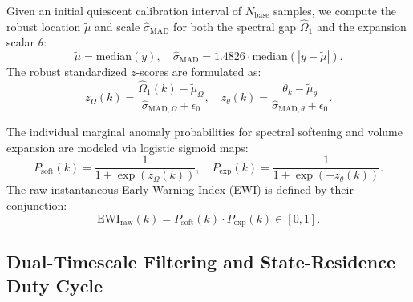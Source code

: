 \documentclass[11pt,a4paper]{article}
\begin{document}
Given an initial quiescent calibration interval of $N_{\mathrm{base}}$ samples, we compute the robust location $\tilde{\mu}$ and scale $\hat{\sigma}_{\mathrm{MAD}}$ for both the spectral gap $\hat{\Omega}_1$ and the expansion scalar $\theta$:
\begin{equation}
\tilde{\mu} = \mathrm{median}(y), \quad \hat{\sigma}_{\mathrm{MAD}} = 1.4826 \cdot \mathrm{median}\left( |y - \tilde{\mu}| \right).
\end{equation}
The robust standardized $z$-scores are formulated as:
\begin{equation}
z_{\Omega}(k) = \frac{\hat{\Omega}_1(k) - \tilde{\mu}_{\Omega}}{\hat{\sigma}_{\mathrm{MAD},\Omega} + \epsilon_0}, \quad z_{\theta}(k) = \frac{\theta_k - \tilde{\mu}_{\theta}}{\hat{\sigma}_{\mathrm{MAD},\theta} + \epsilon_0}.
\end{equation}

The individual marginal anomaly probabilities for spectral softening and volume expansion are modeled via logistic sigmoid maps:
\begin{equation}
P_{\mathrm{soft}}(k) = \frac{1}{1 + \exp\left( z_{\Omega}(k) \right)}, \quad P_{\mathrm{exp}}(k) = \frac{1}{1 + \exp\left( - z_{\theta}(k) \right)}.
\end{equation}
The raw instantaneous Early Warning Index (EWI) is defined by their conjunction:
\begin{equation}
\mathrm{EWI}_{\mathrm{raw}}(k) = P_{\mathrm{soft}}(k) \cdot P_{\mathrm{exp}}(k) \in [0, 1].
\end{equation}

\subsection{Dual-Timescale Filtering and State-Residence Duty Cycle}
\end{document}

